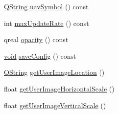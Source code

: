\begin{DoxyCompactItemize}
\item 
\hyperlink{group___u_a_v_objects_plugin_gab9d252f49c333c94a72f97ce3105a32d}{\-Q\-String} \hyperlink{group___o_p_map_plugin_ga6dc1826f569bf6b39ff56efe116dda82}{uav\-Symbol} () const 
\item 
int \hyperlink{group___o_p_map_plugin_ga4d639157ef2beb3437a7d6e4ea3c8a61}{max\-Update\-Rate} () const 
\item 
qreal \hyperlink{group___o_p_map_plugin_ga9cc98eb40adba9b8b721443c2d15f01e}{opacity} () const 
\item 
\hyperlink{group___u_a_v_objects_plugin_ga444cf2ff3f0ecbe028adce838d373f5c}{void} \hyperlink{group___o_p_map_plugin_ga7e3ff578900f8a9c8915321046955fc7}{save\-Config} () const 
\item 
\hyperlink{group___u_a_v_objects_plugin_gab9d252f49c333c94a72f97ce3105a32d}{\-Q\-String} \hyperlink{group___o_p_map_plugin_ga2850b41441065cc1eefef00485f72459}{get\-User\-Image\-Location} ()
\item 
float \hyperlink{group___o_p_map_plugin_gac4cdc48b3330d034dfd37d14fccf1a26}{get\-User\-Image\-Horizontal\-Scale} ()
\item 
float \hyperlink{group___o_p_map_plugin_ga88c5753eccbe21cb720910a47efce3fe}{get\-User\-Image\-Vertical\-Scale} ()
\end{DoxyCompactItemize}
